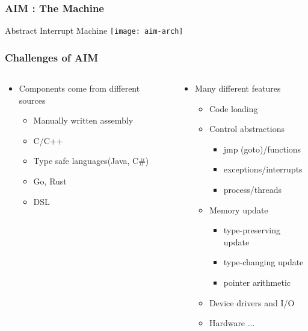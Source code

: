 \begin{frame}[plain]	
	\frametitle{AIM : The Machine}
	\LARGE
	Abstract Interrupt Machine
	\centering
	\texttt{[image: aim-arch]}
	
	
\end{frame}

\begin{frame}[plain,t]
	\frametitle{ Challenges of AIM}
	\begin{columns}[t]
		\begin{column}{.5\textwidth}
			
			\begin{itemize}\Large
				\item Components come
				from different
				sources
				\begin{itemize}\large
					\item Manually written
					assembly
					\item C/C++
					\item Type safe languages(Java, C\#)
					\item Go, Rust
					\item DSL
				\end{itemize}
			\end{itemize}
			
		\end{column}
		
		\begin{column}{.5\textwidth}
			
			\begin{itemize}\Large
				\item Many different features
				\begin{itemize}\large
					\item Code loading \pause
					\item Control abstractions 
					\begin{itemize}\large
						\item jmp (goto)/functions
						\item exceptions/interrupts
						\item process/threads
					\end{itemize}	\pause	
					
					\item Memory update 
					\begin{itemize}\large
						\item type-preserving update
						\item type-changing update
						\item pointer arithmetic
					\end{itemize}	\pause
					\item Device drivers and I/O
					\item Hardware ...					
				\end{itemize}
			\end{itemize}
			
		\end{column}
	\end{columns}
\end{frame}

